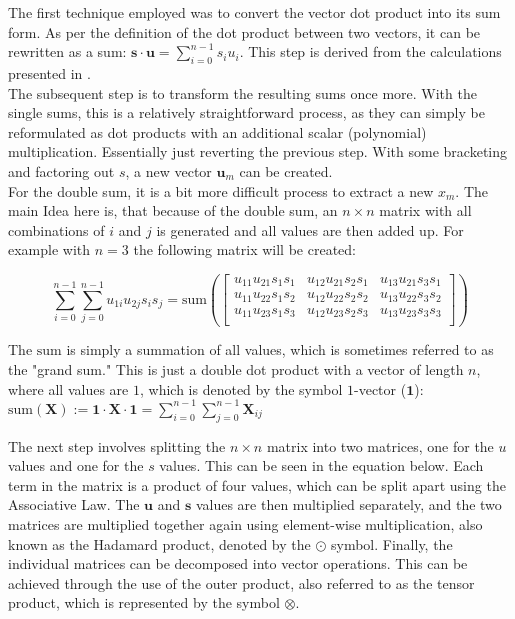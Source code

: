 The first technique employed was to convert the vector dot product into its sum form. As per the definition of the dot product between two vectors, it can be rewritten as a sum: $\textbf{s}\cdot \textbf{u} = \sum_{i=0}^{n-1}s_iu_i$. This step is derived from the calculations presented in \cite{ModHE}.\\
The subsequent step is to transform the resulting sums once more. With the single sums, this is a relatively straightforward process, as they can simply be reformulated as dot products with an additional scalar (polynomial) multiplication. Essentially just reverting the previous step. With some bracketing and factoring out $s$, a new vector $\textbf{u}_m$ can be created. \\
For the double sum, it is a bit more difficult process to extract a new $x_m$. The main Idea here is, that because of the double sum, an $n\times n$ matrix with all combinations of $i$ and $j$ is generated and all values are then added up. For example with $n=3$ the following matrix will be created:

$$
  \sum_{i=0}^{n-1}\sum_{j=0}^{n-1}u_{1i}u_{2j}s_is_j = \mathrm{sum}\left(\begin{bmatrix}
      u_{11}u_{21}s_{1}s_{1} & u_{12}u_{21}s_{2}s_{1} & u_{13}u_{21}s_{3}s_{1} \\
      u_{11}u_{22}s_{1}s_{2} & u_{12}u_{22}s_{2}s_{2} & u_{13}u_{22}s_{3}s_{2} \\
      u_{11}u_{23}s_{1}s_{3} & u_{12}u_{23}s_{2}s_{3} & u_{13}u_{23}s_{3}s_{3} \\
    \end{bmatrix}\right)
$$

The $\mathrm{sum}$ is simply a summation of all values, which is sometimes referred to as the "grand sum." This is just a double dot product with a vector of length $n$, where all values are $1$, which is denoted by the symbol $1$-vector ($\textbf{1}$): $\mathrm{sum}(\textbf{X}):= \textbf{1}\cdot \textbf{X} \cdot \textbf{1} = \sum_{i=0}^{n-1}\sum_{j=0}^{n-1} \textbf{X}_{ij}$

The next step involves splitting the $n \times n$ matrix into two matrices, one for the $u$ values and one for the $s$ values. This can be seen in the equation below. Each term in the matrix is a product of four values, which can be split apart using the Associative Law. The $\textbf{u}$ and $\textbf{s}$ values are then multiplied separately, and the two matrices are multiplied together again using element-wise multiplication, also known as the Hadamard product, denoted by the $\odot$ symbol. Finally, the individual matrices can be decomposed into vector operations. This can be achieved through the use of the outer product, also referred to as the tensor product, which is represented by the symbol $\otimes$.

